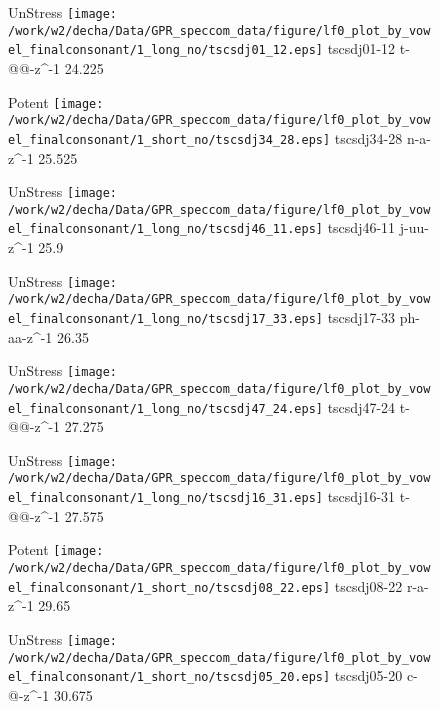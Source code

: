 \documentclass{article}
\begin{document}
\begin{figure}[t]
\begin{minipage}[b]{.24\textwidth}
UnStress
\centering
\texttt{[image: /work/w2/decha/Data/GPR\_speccom\_data/figure/lf0\_plot\_by\_vowel\_finalconsonant/1\_long\_no/tscsdj01\_12.eps]}
tscsdj01-12 t-@@-z\textasciicircum-1 24.225
\end{minipage}
\begin{minipage}[b]{.24\textwidth}
\colorbox{Apricot}{Potent}
\centering
\texttt{[image: /work/w2/decha/Data/GPR\_speccom\_data/figure/lf0\_plot\_by\_vowel\_finalconsonant/1\_short\_no/tscsdj34\_28.eps]}
tscsdj34-28 n-a-z\textasciicircum-1 25.525
\end{minipage}
\begin{minipage}[b]{.24\textwidth}
UnStress
\centering
\texttt{[image: /work/w2/decha/Data/GPR\_speccom\_data/figure/lf0\_plot\_by\_vowel\_finalconsonant/1\_long\_no/tscsdj46\_11.eps]}
tscsdj46-11 j-uu-z\textasciicircum-1 25.9
\end{minipage}
\begin{minipage}[b]{.24\textwidth}
UnStress
\centering
\texttt{[image: /work/w2/decha/Data/GPR\_speccom\_data/figure/lf0\_plot\_by\_vowel\_finalconsonant/1\_long\_no/tscsdj17\_33.eps]}
tscsdj17-33 ph-aa-z\textasciicircum-1 26.35
\end{minipage}
\end{figure}

\begin{figure}[t]
\begin{minipage}[b]{.24\textwidth}
UnStress
\centering
\texttt{[image: /work/w2/decha/Data/GPR\_speccom\_data/figure/lf0\_plot\_by\_vowel\_finalconsonant/1\_long\_no/tscsdj47\_24.eps]}
tscsdj47-24 t-@@-z\textasciicircum-1 27.275
\end{minipage}
\begin{minipage}[b]{.24\textwidth}
UnStress
\centering
\texttt{[image: /work/w2/decha/Data/GPR\_speccom\_data/figure/lf0\_plot\_by\_vowel\_finalconsonant/1\_long\_no/tscsdj16\_31.eps]}
tscsdj16-31 t-@@-z\textasciicircum-1 27.575
\end{minipage}
\begin{minipage}[b]{.24\textwidth}
\colorbox{Apricot}{Potent}
\centering
\texttt{[image: /work/w2/decha/Data/GPR\_speccom\_data/figure/lf0\_plot\_by\_vowel\_finalconsonant/1\_short\_no/tscsdj08\_22.eps]}
tscsdj08-22 r-a-z\textasciicircum-1 29.65
\end{minipage}
\begin{minipage}[b]{.24\textwidth}
UnStress
\centering
\texttt{[image: /work/w2/decha/Data/GPR\_speccom\_data/figure/lf0\_plot\_by\_vowel\_finalconsonant/1\_short\_no/tscsdj05\_20.eps]}
tscsdj05-20 c-@-z\textasciicircum-1 30.675
\end{minipage}
\end{figure}
\end{document}
